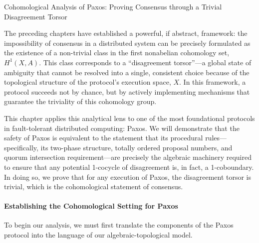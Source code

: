 \documentclass[
]{article}
\begin{document}
\protect{}\label{chapter-5-1-Cohomological_Analysis_of_Paxos__Proving}{}

Cohomological Analysis of Paxos: Proving Consensus through a Trivial
Disagreement Torsor

The preceding chapters have established a powerful, if abstract,
framework: the impossibility of consensus in a distributed system can be
precisely formulated as the existence of a non-trivial class in the
first nonabelian cohomology set, \(H^1(X, A)\). This class corresponds
to a ``disagreement torsor''---a global state of ambiguity that cannot
be resolved into a single, consistent choice because of the topological
structure of the protocol's execution space, \(X\). In this framework, a
protocol succeeds not by chance, but by actively implementing mechanisms
that guarantee the triviality of this cohomology group.

This chapter applies this analytical lens to one of the most
foundational protocols in fault-tolerant distributed computing: Paxos.
We will demonstrate that the safety of Paxos is equivalent to the
statement that its procedural rules---specifically, its two-phase
structure, totally ordered proposal numbers, and quorum intersection
requirement---are precisely the algebraic machinery required to ensure
that any potential 1-cocycle of disagreement is, in fact, a
1-coboundary. In doing so, we prove that for any execution of Paxos, the
disagreement torsor is trivial, which is the cohomological statement of
consensus.

\paragraph{Establishing the Cohomological Setting for
Paxos}\label{establishing-the-cohomological-setting-for-paxos}

To begin our analysis, we must first translate the components of the
Paxos protocol into the language of our algebraic-topological model.
\end{document}
